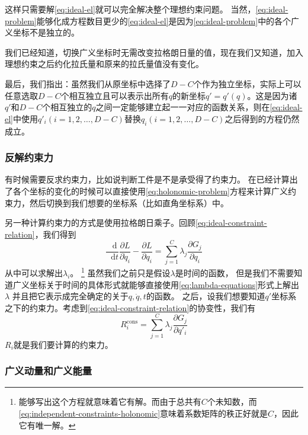 \documentclass[UTF8, a4paper]{ctexart}
\newcommand*{\diff}{\mathop{}\!\mathrm{d}}
\begin{document}
这样只需要解\eqref{eq:ideal-el}就可以完全解决整个理想约束问题。
当然，\eqref{eq:ideal-problem}能够化成方程数目更少的\eqref{eq:ideal-el}是因为\eqref{eq:ideal-problem}中的各个广义坐标不是独立的。

我们已经知道，切换广义坐标时无需改变拉格朗日量的值，现在我们又知道，加入理想约束之后约化拉氏量和原来的拉氏量值没有变化。

最后，我们指出：虽然我们从原坐标中选择了$D-C$个作为独立坐标，实际上可以任意选取$D-C$个相互独立且可以表示出所有$q$的新坐标$q'=q'(q)$。这是因为诸$q'$和$D-C$个相互独立的$q$之间一定能够建立起一一对应的函数关系，则在\eqref{eq:ideal-el}中使用$q'_i(i=1, 2, \ldots, D-C)$替换$q_i(i=1, 2, \ldots, D-C)$之后得到的方程仍然成立。

\subsubsection{反解约束力}

有时候需要反求约束力，比如说判断工件是不是承受得了约束力。
在已经计算出了各个坐标的变化的时候可以直接使用\eqref{eq:holonomic-problem}方程来计算广义约束力，然后切换到我们想要的坐标系（比如直角坐标系）中。

另一种计算约束力的方式是使用拉格朗日乘子。回顾\eqref{eq:ideal-constraint-relation}，我们得到
\begin{equation}
    \frac{\diff}{\diff t} \frac{\partial L}{\partial \dot{q}_i} - \frac{\partial L}{\partial q_i} = \sum_{j=1}^C \lambda_j \frac{\partial G_j}{\partial q_i}
    \label{eq:lambda-equations}
\end{equation}
从中可以求解出$\lambda_i$。%
\footnote{能够写出这个方程就意味着它有解。而由于总共有$C$个未知数，而\eqref{eq:independent-constraints-holonomic}意味着系数矩阵的秩正好就是$C$，因此它有唯一解。}%
虽然我们之前只是假设$\lambda$是时间的函数，
但是我们不需要知道广义坐标关于时间的具体形式就能够直接使用\eqref{eq:lambda-equations}形式上解出$\lambda$
并且把它表示成完全确定的关于$q, \dot{q}, t$的函数。
之后，设我们想要知道$q'$坐标系之下的约束力。考虑到\eqref{eq:ideal-constraint-relation}的协变性，我们有
\begin{equation}
    R^{\text{cons}}_i = \sum_{j=1}^C \lambda_j \frac{\partial G_j}{\partial q'_i} 
\end{equation}
$R_i$就是我们要计算的约束力。

\subsubsection{广义动量和广义能量}
\end{document}
